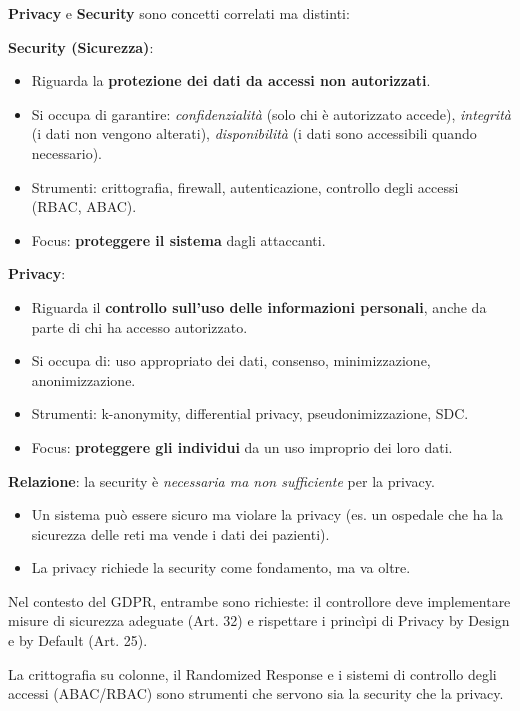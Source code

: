 \documentclass[a4paper,11pt]{article}
\begin{document}
\textbf{Privacy} e \textbf{Security} sono concetti correlati ma distinti:

\textbf{Security (Sicurezza)}:
\begin{itemize}
  \item Riguarda la \textbf{protezione dei dati da accessi non autorizzati}.
  \item Si occupa di garantire: \emph{confidenzialit\`{a}} (solo chi \`{e} autorizzato accede), \emph{integrit\`{a}} (i dati non vengono alterati), \emph{disponibilit\`{a}} (i dati sono accessibili quando necessario).
  \item Strumenti: crittografia, firewall, autenticazione, controllo degli accessi (RBAC, ABAC).
  \item Focus: \textbf{proteggere il sistema} dagli attaccanti.
\end{itemize}

\textbf{Privacy}:
\begin{itemize}
  \item Riguarda il \textbf{controllo sull'uso delle informazioni personali}, anche da parte di chi ha accesso autorizzato.
  \item Si occupa di: uso appropriato dei dati, consenso, minimizzazione, anonimizzazione.
  \item Strumenti: k-anonymity, differential privacy, pseudonimizzazione, SDC.
  \item Focus: \textbf{proteggere gli individui} da un uso improprio dei loro dati.
\end{itemize}

\textbf{Relazione}: la security \`{e} \emph{necessaria ma non sufficiente} per la privacy.
\begin{itemize}
  \item Un sistema pu\`{o} essere sicuro ma violare la privacy (es. un ospedale che ha la sicurezza delle reti ma vende i dati dei pazienti).
  \item La privacy richiede la security come fondamento, ma va oltre.
\end{itemize}

Nel contesto del GDPR, entrambe sono richieste: il controllore deve implementare misure di sicurezza adeguate (Art. 32) e rispettare i princìpi di Privacy by Design e by Default (Art. 25).

La crittografia su colonne, il Randomized Response e i sistemi di controllo degli accessi (ABAC/RBAC) sono strumenti che servono sia la security che la privacy.
\end{document}
